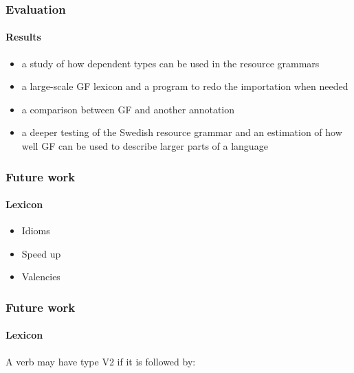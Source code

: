 \documentclass[10pt]{beamer}
\renewcommand{\baselinestretch}{1.5}
\begin{document}
\begin{frame}
 \renewcommand{\baselinestretch}{1.0}
\frametitle{Evaluation}
\framesubtitle{Results} 
\begin{itemize}
\item a study of how dependent types can be used in the resource grammars
\item a large-scale GF lexicon and a program to redo the importation when needed
\item a comparison between GF and another annotation
\item a deeper testing of the Swedish resource grammar and an estimation
of how well GF can be used to describe larger parts of a language
\end{itemize}
\end{frame}






\begin{frame}
 \renewcommand{\baselinestretch}{1.0}
\frametitle{Future work}
\framesubtitle{Lexicon} 
\begin{itemize}
\item Idioms
\item Speed up
\item Valencies
\end{itemize}
\end{frame}


\begin{frame}
 \renewcommand{\baselinestretch}{1.0}
\frametitle{Future work}
\framesubtitle{Lexicon} 
A verb may have type V2 if it is followed by:
\end{frame}
\end{document}
